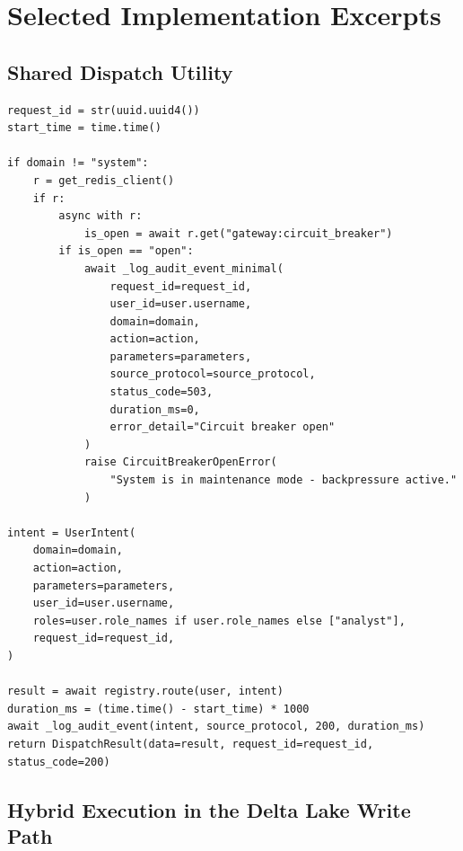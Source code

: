 \documentclass[12pt, a4paper]{report}
\begin{document}
\chapter{Selected Implementation Excerpts}
\label{app:code}

\section{Shared Dispatch Utility}
\label{app:dispatch}

\begin{lstlisting}[caption={Condensed excerpt of the Shared Dispatch Utility showing
trace injection, audit logging, and circuit-breaker enforcement.}, label={lst:dispatch}]
request_id = str(uuid.uuid4())
start_time = time.time()

if domain != "system":
    r = get_redis_client()
    if r:
        async with r:
            is_open = await r.get("gateway:circuit_breaker")
        if is_open == "open":
            await _log_audit_event_minimal(
                request_id=request_id,
                user_id=user.username,
                domain=domain,
                action=action,
                parameters=parameters,
                source_protocol=source_protocol,
                status_code=503,
                duration_ms=0,
                error_detail="Circuit breaker open"
            )
            raise CircuitBreakerOpenError(
                "System is in maintenance mode - backpressure active."
            )

intent = UserIntent(
    domain=domain,
    action=action,
    parameters=parameters,
    user_id=user.username,
    roles=user.role_names if user.role_names else ["analyst"],
    request_id=request_id,
)

result = await registry.route(user, intent)
duration_ms = (time.time() - start_time) * 1000
await _log_audit_event(intent, source_protocol, 200, duration_ms)
return DispatchResult(data=result, request_id=request_id, status_code=200)
\end{lstlisting}

\section{Hybrid Execution in the Delta Lake Write Path}
\label{app:hybrid_exec_code}
\end{document}
